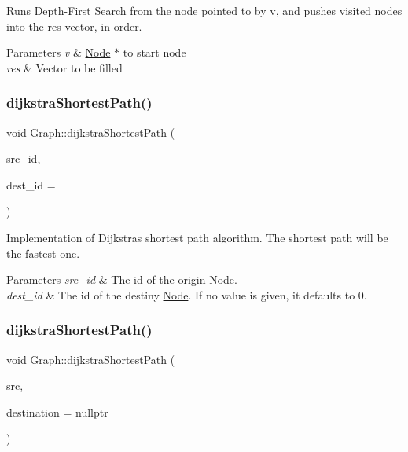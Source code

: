 Runs Depth-\/\+First Search from the node pointed to by v, and pushes visited nodes into the res vector, in order.


\begin{DoxyParams}{Parameters}
{\em v} & \hyperlink{class_node}{Node} $\ast$ to start node \\
\hline
{\em res} & Vector to be filled \\
\hline
\end{DoxyParams}
\hypertarget{class_graph_a819fb225997f026a192ec5df1b17df84}{}\label{class_graph_a819fb225997f026a192ec5df1b17df84} 
\subsubsection{\texorpdfstring{dijkstra\+Shortest\+Path()}{dijkstraShortestPath()}\hspace{0.1cm}{\footnotesize\ttfamily [1/4]}}
{\footnotesize\ttfamily void Graph\+::dijkstra\+Shortest\+Path (\begin{DoxyParamCaption}\item[{\hyperlink{_node_8hpp_a9d6265804805c2375068fd7484840dc6}{node\+\_\+id}}]{src\+\_\+id,  }\item[{\hyperlink{_node_8hpp_a9d6265804805c2375068fd7484840dc6}{node\+\_\+id}}]{dest\+\_\+id = {} }\end{DoxyParamCaption})}

Implementation of Dijkstra\textquotesingle{}s shortest path algorithm. The shortest path will be the fastest one.


\begin{DoxyParams}{Parameters}
{\em src\+\_\+id} & The id of the origin \hyperlink{class_node}{Node}. \\
\hline
{\em dest\+\_\+id} & The id of the destiny \hyperlink{class_node}{Node}. If no value is given, it defaults to 0. \\
\hline
\end{DoxyParams}
\hypertarget{class_graph_a0fc41701fa170ab69282ae8a571fdc04}{}\label{class_graph_a0fc41701fa170ab69282ae8a571fdc04} 
\subsubsection{\texorpdfstring{dijkstra\+Shortest\+Path()}{dijkstraShortestPath()}\hspace{0.1cm}{\footnotesize\ttfamily [2/4]}}
{\footnotesize\ttfamily void Graph\+::dijkstra\+Shortest\+Path (\begin{DoxyParamCaption}\item[{\hyperlink{class_node}{Node} $\ast$}]{src,  }\item[{\hyperlink{class_node}{Node} $\ast$}]{destination = {\ttfamily nullptr} }\end{DoxyParamCaption})}

